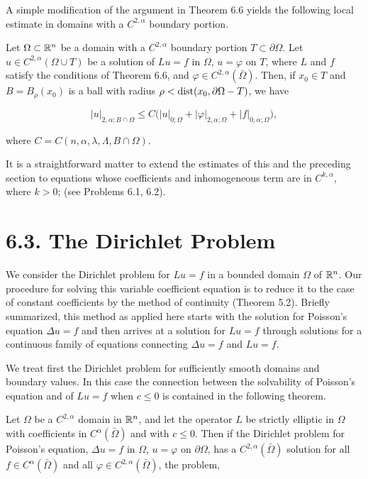 
A simple modification of the argument in Theorem 6.6 yields the following local estimate in domains with a $C^{2,\alpha}$ boundary portion.

\begin{corollary}[6.7]
Let $\Omega \subset \mathbb{R}^n$ be a domain with a $C^{2,\alpha}$ boundary portion $T \subset \partial\Omega$. Let $u \in C^{2,\alpha}(\Omega \cup T)$ be a solution of $Lu=f$ in $\Omega$, $u=\varphi$ on $T$, where $L$ and $f$ satisfy the conditions of Theorem 6.6, and $\varphi \in C^{2,\alpha}(\bar{\Omega})$. Then, if $x_0 \in T$ and $B = B_\rho(x_0)$ is a ball with radius $\rho < \operatorname{dist}(x_0,\partial\Omega - T)$, we have
\end{corollary}

\begin{equation}
\tag{6.38}
\lvert u \rvert_{2,\alpha;B \cap \Omega} \le C\bigl(\lvert u \rvert_{0;\Omega} + \lvert \varphi \rvert_{2,\alpha;\Omega} + \lvert f \rvert_{0,\alpha;\Omega}\bigr),
\end{equation}

where $C = C(n,\alpha,\lambda,\Lambda,B \cap \Omega)$.

It is a straightforward matter to extend the estimates of this and the preceding section to equations whose coefficients and inhomogeneous term are in $C^{k,\alpha}$, where $k > 0$; (see Problems 6.1, 6.2).

\section*{6.3. The Dirichlet Problem}

We consider the Dirichlet problem for $Lu=f$ in a bounded domain $\Omega$ of $\mathbb{R}^n$. Our procedure for solving this variable coefficient equation is to reduce it to the case of constant coefficients by the method of continuity (Theorem 5.2). Briefly summarized, this method as applied here starts with the solution for Poisson's equation $\Delta u=f$ and then arrives at a solution for $Lu=f$ through solutions for a continuous family of equations connecting $\Delta u=f$ and $Lu=f$.

We treat first the Dirichlet problem for sufficiently smooth domains and boundary values. In this case the connection between the solvability of Poisson's equation and of $Lu=f$ when $c\le 0$ is contained in the following theorem.

\begin{theorem}[6.8]
Let $\Omega$ be a $C^{2,\alpha}$ domain in $\mathbb{R}^n$, and let the operator $L$ be strictly elliptic in $\Omega$ with coefficients in $C^{\alpha}(\bar{\Omega})$ and with $c\le 0$. Then if the Dirichlet problem for Poisson's equation, $\Delta u=f$ in $\Omega$, $u=\varphi$ on $\partial\Omega$, has a $C^{2,\alpha}(\bar{\Omega})$ solution for all $f \in C^{\alpha}(\bar{\Omega})$ and all $\varphi \in C^{2,\alpha}(\bar{\Omega})$, the problem,
\end{theorem}

